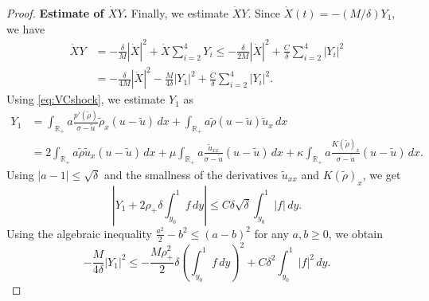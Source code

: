 \documentclass[11pt,reqno]{amsart}
\numberwithin{equation}{section} %
\newcommand{\R}{\mathbb{R}}
\begin{document}
\begin{proof}
\vspace{2mm}
\noindent\textbf{Estimate of $\dot{X}Y$.} Finally, we estimate $\dot{X}Y$. Since $\dot{X}(t)=-(M/\delta)Y_1$, we have
\begin{align*}
\dot{X} Y
&= -\frac{\delta}{M}|\dot{X}|^2+\dot{X} \sum_{i=2}^4 Y_i
\le -\frac{\delta}{2M}|\dot{X}|^2+\frac{C}{\delta} \sum_{i=2}^4 |Y_i|^2\\
&=-\frac{\delta}{4M}|\dot{X}|^2-\frac{M}{4\delta}|Y_1|^2+\frac{C}{\delta}\sum_{i=2}^4|Y_i|^2.
\end{align*}
Using \eqref{eq:VCshock}, we estimate $Y_1$ as
\begin{align*}
	Y_1&=\int_{\R_+}a\frac{p'(\tilde{\rho})}{\sigma-\tilde{u}}\tilde{\rho}_x(u-\tilde{u})\,dx +\int_{\R_+}a\tilde{\rho}(u-\tilde{u})\tilde{u}_x\,dx\\
	&=2\int_{\R_+}a\tilde{\rho}\tilde{u}_x(u-\tilde{u})\,dx+\mu\int_{\R_+}a\frac{\tilde{u}_{xx}}{\sigma-\tilde{u}}(u-\tilde{u})\,dx +\kappa\int_{\R_+}a\frac{K(\tilde{\rho})_x}{\sigma-\tilde{u}}(u-\tilde{u})\,dx.
\end{align*}
Using $|a-1|\le \sqrt{\delta}$ and the smallness of the derivatives $\tilde{u}_{xx}$ and $K(\tilde{\rho})_x$, we get
\begin{equation*}
\left|Y_1 + 2\rho_+\delta\int_{y_0}^1 f \, dy\right| \le C\delta\sqrt{\delta}\int_{y_0}^1 |f| \, dy.
\end{equation*}
Using the algebraic inequality $\frac{a^2}{2} - b^2 \leq (a-b)^2$ for any $a,b\geq 0$, we obtain
\begin{equation*}
-\frac{M}{4\delta}|Y_1|^2 \le -\frac{M\rho_+^2}{2}\delta \left(\int_{y_0}^1 f\,dy\right)^2+C\delta^2\int_{y_0}^1|f|^2\,dy.
\end{equation*}


\end{proof}
\end{document}
